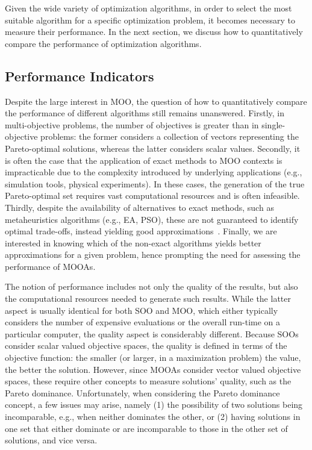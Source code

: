 	Given the wide variety of optimization algorithms, in order to select the most suitable algorithm for a specific optimization problem, it becomes necessary to measure their performance. In the next section, we discuss how to quantitatively compare the performance of optimization algorithms.
	
	
	\subsection{Performance Indicators}
	\label{ssec:performance}
	Despite the large interest in \ac{MOO}, the question of how to quantitatively compare the performance of different algorithms still remains unanswered. Firstly, in multi-objective problems, the number of objectives is greater than in single-objective problems: the former considers a collection of vectors representing the Pareto-optimal solutions, whereas the latter considers scalar values. Secondly, it is often the case that the application of exact methods to \ac{MOO} contexts is impracticable due to the complexity introduced by underlying applications (e.g., simulation tools, physical experiments). In these cases, the generation of the true Pareto-optimal set requires vast computational resources and is often infeasible. Thirdly, despite the availability of alternatives to exact methods, such as metaheuristics algorithms (e.g., \ac{EA}, \ac{PSO}), these are not guaranteed to identify optimal trade-offs, instead yielding good approximations~\cite{Zitzler2003Metrics}. Finally, we are interested in knowing which of the non-exact algorithms yields better approximations for a given problem, hence prompting the need for assessing the performance of \acp{MOOA}.
	
	The notion of performance includes not only the quality of the results, but also the computational resources needed to generate such results. While the latter aspect is usually identical for both \ac{SOO} and \ac{MOO}, which either typically considers the number of expensive evaluations or the overall run-time on a particular computer, the quality aspect is considerably different. Because \acp{SOO} consider scalar valued objective spaces, the quality is defined in terms of the objective function: the smaller (or larger, in a maximization problem) the value, the better the solution. However, since \acp{MOOA} consider vector valued objective spaces, these require other concepts to measure solutions' quality, such as the Pareto dominance. Unfortunately, when considering the Pareto dominance concept, a few issues may arise, namely (1) the possibility of two solutions being incomparable, e.g., when neither dominates the other, or (2) having solutions in one set that either dominate or are incomparable to those in the other set of solutions, and vice versa. 
	
